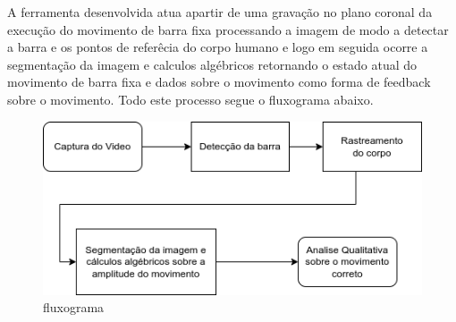  A ferramenta desenvolvida atua apartir de uma gravação no plano coronal da execução do movimento de barra fixa processando a imagem de modo a detectar a barra e os pontos de referêcia do corpo humano e logo em seguida ocorre a segmentação da imagem e calculos algébricos retornando o estado atual do movimento de barra fixa e dados sobre o movimento como forma de feedback sobre o movimento. Todo este processo segue o fluxograma abaixo.

\begin{figure}[!htb]
	\centering
	\includegraphics[scale=0.7]{figuras/diagrama/processo.png}
	\caption{fluxograma}
	\label{fig:fluxo}
\end{figure}





